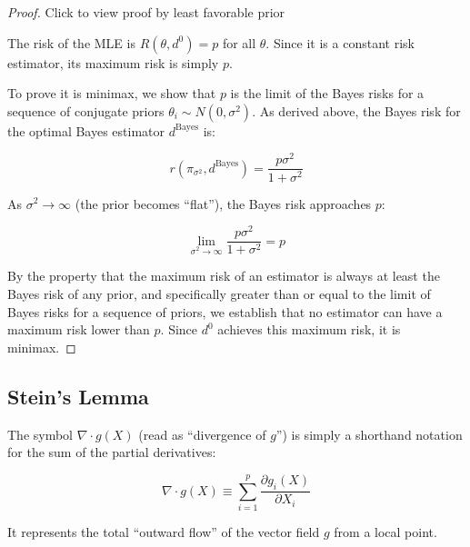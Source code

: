 \documentclass[
  letterpaper,
  DIV=11,
  numbers=noendperiod]{scrreprt}
\renewcommand{\[}{\begin{equation}}
\renewcommand{\]}{\end{equation}}
\theoremstyle{definition}
\theoremstyle{plain}
\theoremstyle{plain}
\theoremstyle{plain}
\theoremstyle{definition}
\theoremstyle{plain}
\theoremstyle{remark}
\begin{document}
\begin{proof}
\leavevmode

Click to view proof by least favorable prior

The risk of the MLE is \(R(\theta, d^0) = p\) for all \(\theta\). Since
it is a constant risk estimator, its maximum risk is simply \(p\).

To prove it is minimax, we show that \(p\) is the limit of the Bayes
risks for a sequence of conjugate priors
\(\theta_i \sim N(0, \sigma^2)\). As derived above, the Bayes risk for
the optimal Bayes estimator \(d^{\text{Bayes}}\) is:

\[
r(\pi_{\sigma^2}, d^{\text{Bayes}}) = \frac{p\sigma^2}{1 + \sigma^2}
\]

As \(\sigma^2 \to \infty\) (the prior becomes ``flat''), the Bayes risk
approaches \(p\):

\[
\lim_{\sigma^2 \to \infty} \frac{p\sigma^2}{1 + \sigma^2} = p
\]

By the property that the maximum risk of an estimator is always at least
the Bayes risk of any prior, and specifically greater than or equal to
the limit of Bayes risks for a sequence of priors, we establish that no
estimator can have a maximum risk lower than \(p\). Since \(d^0\)
achieves this maximum risk, it is minimax.

\end{proof}

\subsection{Stein's Lemma}\label{steins-lemma}

\begin{tcolorbox}[enhanced jigsaw, toptitle=1mm, arc=.35mm, left=2mm, toprule=.15mm, bottomtitle=1mm, opacityback=0, rightrule=.15mm, title=\textcolor{quarto-callout-note-color}{\faInfo}\hspace{0.5em}{Notation: The Divergence Operator}, colback=white, coltitle=black, titlerule=0mm, colbacktitle=quarto-callout-note-color!10!white, breakable, leftrule=.75mm, bottomrule=.15mm, opacitybacktitle=0.6, colframe=quarto-callout-note-color-frame]

The symbol \(\nabla \cdot g(X)\) (read as ``divergence of \(g\)'') is
simply a shorthand notation for the sum of the partial derivatives:

\[
\nabla \cdot g(X) \equiv \sum_{i=1}^p \frac{\partial g_i(X)}{\partial X_i}
\]

It represents the total ``outward flow'' of the vector field \(g\) from
a local point.

\end{tcolorbox}
\end{document}

